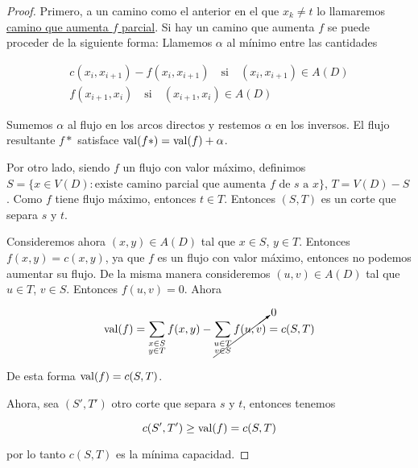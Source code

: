 \begin{proof}
    Primero, a un camino como el anterior en el que $x_k \neq t$ lo llamaremos \ul{camino que aumenta $f$ parcial}. Si hay un camino que aumenta $f$ se puede proceder de la siguiente forma: Llamemos $\alpha$ al mínimo entre las cantidades

    \begin{gather*}
        c(x_i, x_{i+1}) - f(x_i, x_{i+1}) \quad \text{si} \quad (x_i, x_{i+1}) \in A(D) \\
        f(x_{i+1}, x_i) \quad \text{si} \quad (x_{i+1}, x_i) \in A(D)
    \end{gather*}
    
    Sumemos $\alpha$ al flujo en los arcos directos y restemos $\alpha$ en los inversos. El flujo resultante $f*$ satisface $\operatorname{val}(f*) = \operatorname{val}(f) + \alpha$.
    
    Por otro lado, siendo $f$ un flujo con valor máximo, definimos $S = \{x \in V(D): \text{existe camino parcial que aumenta $f$ de $s$ a $x$}\}$, $T = V(D) - S$. Como $f$ tiene flujo máximo, entonces $t \in T$. Entonces $(S,T)$ es un corte que separa $s$ y $t$.
    
    Consideremos ahora $(x,y) \in A(D)$ tal que $x \in S$, $y \in T$. Entonces $f(x,y)=c(x,y)$, ya que $f$ es un flujo con valor máximo, entonces no podemos aumentar su flujo. De la misma manera consideremos $(u,v) \in A(D)$ tal que $u \in T$, $v \in S$. Entonces $f(u,v) = 0$. Ahora
    
    \[
    \operatorname{val}(f) = \sum_{\substack{x\in S \\ y \in T}} f(x,y) - \cancelto{0}{\sum_{\substack{u\in T \\ v \in S}} f(u,v)} = c(S,T)
    \]
    
    De esta forma $\operatorname{val}(f) = c(S,T)$.
    
    Ahora, sea $(S',T')$ otro corte que separa $s$ y $t$, entonces tenemos
    
    \[
    c(S',T') \geq \operatorname{val}(f) = c(S,T)
    \]
    
    \noindent por lo tanto $c(S,T)$ es la mínima capacidad.
\end{proof}